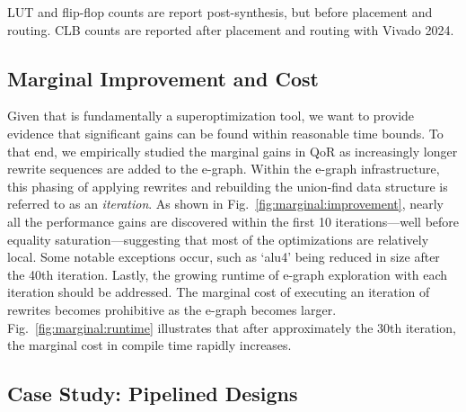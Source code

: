 \begin{table}[t]
    \centering
    \caption{LUT and flip-flop counts are report post-synthesis, but before placement and routing. CLB counts are reported after placement and routing with Vivado 2024.}\label{tab:multiply}
\end{table}

\subsection{Marginal Improvement and Cost}\label{sec:results:margin}

Given that \shortname{} is fundamentally a superoptimization tool, we want to
provide evidence that significant gains can be found within reasonable time
bounds. To that end, we empirically studied the marginal gains in QoR as
increasingly longer rewrite sequences are added to the e-graph. Within the
e-graph infrastructure, this phasing of applying rewrites and rebuilding the
union-find data structure is referred to as an \textit{iteration}. As shown in
Fig.~\ref{fig:marginal:improvement}, nearly all the performance gains are
discovered within the first 10 iterations---well before equality
saturation---suggesting that most of the optimizations are relatively local.
Some notable exceptions occur, such as `alu4' being reduced in size after the
40th iteration. Lastly, the growing runtime of e-graph exploration with each
iteration should be addressed. The marginal cost of executing an iteration of
rewrites becomes prohibitive as the e-graph becomes larger.
Fig.~\ref{fig:marginal:runtime} illustrates that after approximately the 30th
iteration, the marginal cost in compile time rapidly increases.

\subsection{Case Study: Pipelined Designs}\label{sec:results:retiming}

